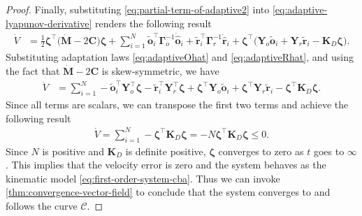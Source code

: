 \begin{proof}
    Finally, substituting \eqref{eq:partial-term-of-adaptive2} into \eqref{eq:adaptive-lyapunov-derivative} renders the following result
    \begin{align}
        \dot{V} &= \frac{1}{2}\boldsymbol{\zeta}^\top \bigl(\dot{\mathbf{M}}- 2\mathbf{C}\bigr) \boldsymbol{\zeta} + \sum\limits_{i=1}^{N} \widetilde{\mathbf{o}}_i^\top \boldsymbol{\Gamma}_o^{-1} \dot{\hat{\mathbf{o}}}_i + \widetilde{\mathbf{r}}_i^\top \boldsymbol{\Gamma}_r^{-1}\dot{\hat{\mathbf{r}}}_i + \boldsymbol{\zeta}^\top\bigl(\mathbf{Y}_o\widetilde{\mathbf{o}}_i + \mathbf{Y}_r\widetilde{\mathbf{r}}_i - \mathbf{K}_D\boldsymbol{\zeta} \bigr).
    \end{align}
    Substituting adaptation laws \eqref{eq:adaptiveOhat} and \eqref{eq:adaptiveRhat}, and using the fact that $\dot{\mathbf{M}} - 2\mathbf{C}$ is skew-symmetric, we have
    \begin{align}
        \dot{V} &= \sum\limits_{i=1}^{N} -\widetilde{\mathbf{o}}_i^\top \mathbf{Y}^\top_o\boldsymbol{\zeta}  - \widetilde{\mathbf{r}}_i^\top\mathbf{Y}^\top_r\boldsymbol{\zeta} + \boldsymbol{\zeta}^\top\mathbf{Y}_o\widetilde{\mathbf{o}}_i + \boldsymbol{\zeta}^\top\mathbf{Y}_r\widetilde{\mathbf{r}}_i - \boldsymbol{\zeta}^\top\mathbf{K}_D\boldsymbol{\zeta}.
    \end{align}
    Since all terms are scalars, we can transpose the first two terms and achieve the following result
    \begin{align}
        \dot{V} = \sum\limits_{i=1}^{N}-\boldsymbol{\zeta}^\top\mathbf{K}_D\boldsymbol{\zeta} = -N\boldsymbol{\zeta}^\top\mathbf{K}_D\boldsymbol{\zeta} \le 0.
    \end{align}
    Since $N$ is positive and $\mathbf{K}_D$ is definite positive, $\boldsymbol{\zeta}$ converges to zero as $t$ goes to $\infty$. This implies that the velocity error is zero and the system behaves as the kinematic model \eqref{eq:first-order-system-cba}. Thus we can invoke \cref{thm:convergence-vector-field} to conclude that the system converges to and follows the curve $\mathcal{C}$.
\end{proof}


